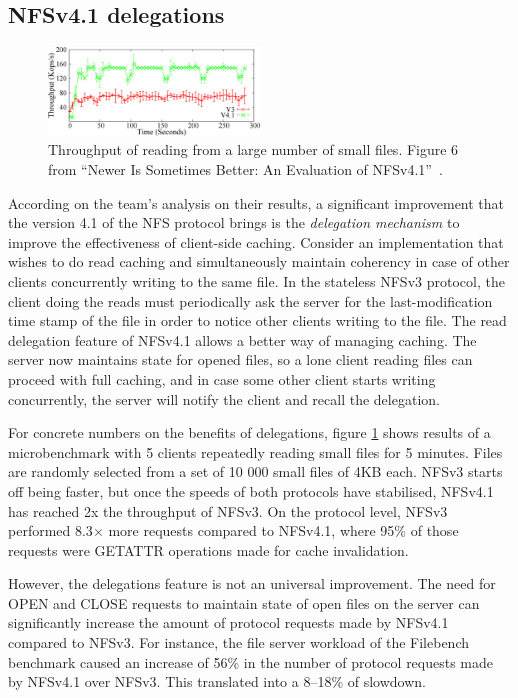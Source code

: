 \subsection{NFSv4.1 delegations}

\begin{figure}[h]
\centering\includegraphics[width=0.5\textwidth]{images/nfsv41better-reading-small-files.png}
\caption{Throughput of reading from a large number of small files. Figure 6 from ``Newer Is Sometimes Better: An Evaluation of NFSv4.1''~\cite{NFSv4Better}.}
\label{fig:nfsv41randread}
\end{figure}

According on the team's analysis on their results, a significant improvement that the version 4.1 of the NFS protocol brings is the \emph{delegation
mechanism} to improve the effectiveness of client-side caching.
Consider an implementation that wishes to do read caching and simultaneously maintain coherency in case of other clients
concurrently writing to the same file.
In the stateless NFSv3 protocol, the client doing the reads must periodically ask the server for the last-modification time stamp of the file in order to notice other clients writing to the file.
The read delegation feature of NFSv4.1 allows a better way of managing caching.
The server now maintains state for opened files, so a lone client reading files can proceed with full caching,
and in case some other client starts writing concurrently, the server will notify the client and recall the delegation.

For concrete numbers on the benefits of delegations,
figure \ref{fig:nfsv41randread} shows results of a microbenchmark with 5 clients repeatedly reading small files for 5 minutes.
Files are randomly selected from a set of 10 000 small files of 4KB each.
NFSv3 starts off being faster, but once the speeds of both protocols have stabilised,
NFSv4.1 has reached 2x the throughput of NFSv3.
On the protocol level, NFSv3 performed 8.3$\times$ more requests compared to NFSv4.1,
where 95\% of those requests were GETATTR operations made for cache invalidation.

However, the delegations feature is not an universal improvement.
The need for OPEN and CLOSE requests to maintain state of open files on the server can significantly increase the amount of protocol requests made by NFSv4.1 compared to NFSv3.
For instance, the file server workload of the Filebench benchmark caused an increase of 56\% in the number of protocol requests made by NFSv4.1 over NFSv3.
This translated into a 8--18\% of slowdown.

